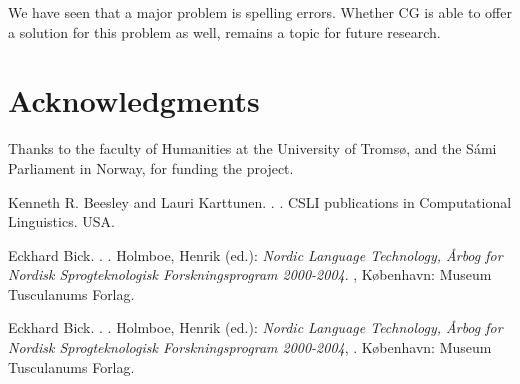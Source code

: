 \documentclass[11pt]{article}
\begin{document}
We have seen that a major problem is spelling errors. Whether CG is able to offer a solution for this problem as well, remains a topic for future research.

\section*{Acknowledgments}
Thanks to the faculty of Humanities at the University of Tromsø, and the Sámi Parliament in Norway, for funding the project. 

\begin{thebibliography}{}

{Kenneth R. Beesley and Lauri Karttunen}.
.
.
\newblock CSLI publications in Computational Linguistics.
\newblock USA.

{Eckhard Bick}.
.
.
\newblock Holmboe, Henrik (ed.): {\em Nordic Language Technology, Årbog for Nordisk Sprogteknologisk Forskningsprogram 2000-2004}.
,
\newblock København: Museum Tusculanums Forlag.

{Eckhard Bick}.
.
.
\newblock Holmboe, Henrik (ed.): {\em Nordic Language Technology, Årbog for Nordisk Sprogteknologisk Forskningsprogram 2000-2004},
.
\newblock København: Museum Tusculanums Forlag.




\end{thebibliography}
\end{document}
